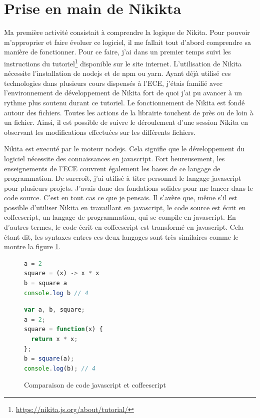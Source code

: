 \documentclass[12pt, french]{report}
\begin{document}
\section{Prise en main de Nikikta}

Ma première activité consistait à comprendre la logique de Nikita. Pour pouvoir m'approprier et faire évoluer ce logiciel, il me fallait tout d'abord comprendre sa manière de fonctionner. Pour ce faire, j'ai dans un premier temps suivi les instructions du tutoriel\footnote{\href{https://nikita.js.org/about/tutorial/}{https://nikita.js.org/about/tutorial/}} disponible sur le site internet. L'utilisation de Nikita nécessite l'installation de \gls{nodejs} et de \gls{npm} ou \gls{yarn}. Ayant déjà utilisé ces technologies dans plusieurs cours dispensés à l'ECE, j'étais familié avec l'environnement de développement de Nikita fort de quoi j'ai pu avancer à un rythme plus soutenu durant ce tutoriel. Le fonctionnement de Nikita est fondé autour des fichiers. Toutes les actions de la librairie touchent de près ou de loin à un fichier. Ainsi, il est possible de suivre le déroulement d'une session Nikita en observant les modifications effectuées sur les différents fichiers.

Nikita est executé par le moteur \gls{nodejs}. Cela signifie que le développement du logiciel nécessite des connaissances en \gls{javascript}. Fort heureusement, les enseignements de l'ECE couvrent également les bases de ce langage de programmation. De surcroît, j'ai utilisé à titre personnel le langage \gls{javascript} pour plusieurs projets. J'avais donc des fondations solides pour me lancer dans le code source. C'est en tout cas ce que je pensais. Il s'avère que, même s'il est possible d'utiliser Nikita en travaillant en \gls{javascript}, le code source est écrit en \gls{coffeescript}, un langage de programmation, qui se compile en \gls{javascript}. En d'autres termes, le code écrit en \gls{coffeescript} est transformé en \gls{javascript}. Cela étant dit, les syntaxes entres ces deux langages sont très similaires comme le montre la figure \ref{code:jscoffeecomparison}.

\begin{figure}[H]
\begin{minipage}{0.45\textwidth}
\begin{lstlisting}[language=JavaScript]
a = 2
square = (x) -> x * x
b = square a
console.log b // 4
\end{lstlisting}
\end{minipage}\hfill
\begin{minipage}{0.45\textwidth}
\begin{lstlisting}[language=JavaScript]
var a, b, square;
a = 2;
square = function(x) {
  return x * x;
};
b = square(a);
console.log(b); // 4
\end{lstlisting}
\end{minipage}\hfill
\centering
\caption{Comparaison de code \gls{javascript} et \gls{coffeescript}}
\label{code:jscoffeecomparison}
\end{figure}
\end{document}
